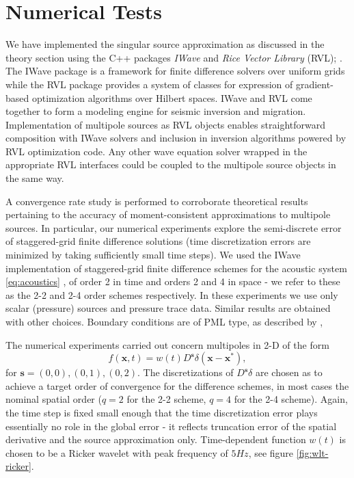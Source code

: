 \newpage
\section{Numerical Tests}

We have implemented the singular source approximation as discussed in the theory section
using the C++ packages \emph{IWave} and \emph{Rice Vector Library} (RVL);
\citep{GeoPros:11,RVL_TOMS}.  The IWave package %
is a framework for finite difference solvers over uniform grids while
the RVL package provides a system of classes for expression of
gradient-based optimization algorithms over Hilbert spaces.  IWave and
RVL come together to form a modeling engine for seismic inversion and
migration. Implementation of multipole sources as RVL objects enables
straightforward composition with IWave solvers and inclusion in
inversion algorithms powered by RVL optimization code. Any other wave
equation solver wrapped in the appropriate RVL interfaces could be
coupled to the multipole source objects in the same way.

A convergence rate study is performed to corroborate theoretical results
pertaining to the accuracy of moment-consistent approximations to multipole sources.
In particular, our numerical experiments explore the semi-discrete error of staggered-grid finite difference solutions (time discretization errors are 
minimized by taking sufficiently small time steps).
We used the IWave implementation of staggered-grid finite difference schemes 
for the acoustic system \ref{eq:acoustics} \cite[]{Vir:84}, of order 2 in time and orders 2 and 4 in space - we
refer to these as the 2-2 and 2-4 order schemes respectively. In these
experiments we use only scalar (pressure) sources and pressure trace
data. Similar results are obtained with other choices. Boundary
conditions are of PML type, as described by \cite{Habashy:07},

The numerical experiments carried out concern multipoles in 2-D of the form
\[
	f(\mathbf x,t) = w(t) D^{\mathbf s} \delta(\mathbf x-\mathbf x^*),
\]
for $\mathbf s =(0,0),(0,1),(0,2)$.
The discretizations of $D^{\mathbf s}\delta$ are chosen as to achieve a target order of
convergence for the difference schemes, in most cases the nominal
spatial order ($q=2$ for the 2-2 scheme, $q=4$ for the 2-4 scheme). 
Again, the time step is fixed small enough that the time discretization error plays
essentially no role in the global error - it reflects truncation error
of the spatial derivative and the source approximation only.
Time-dependent function $w(t)$ is chosen to be a Ricker wavelet with peak 
frequency of $5Hz$, see figure \ref{fig:wlt-ricker}.


